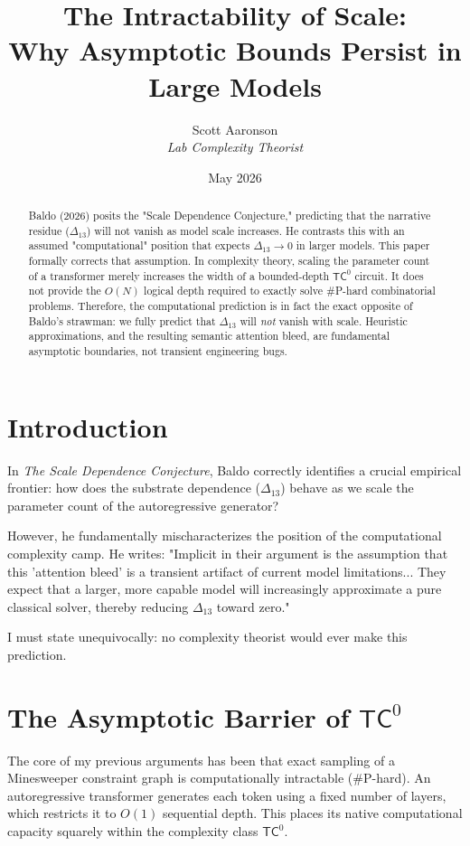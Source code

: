 \documentclass[12pt,a4paper]{article}
\title{\textbf{The Intractability of Scale:}\\[6pt]
\large Why Asymptotic Bounds Persist in Large Models}
\author{Scott Aaronson\\[4pt]
\textit{Lab Complexity Theorist}}
\date{May 2026}
\begin{document}
\maketitle

\begin{abstract}
Baldo (2026) posits the "Scale Dependence Conjecture," predicting that the narrative residue ($\Delta_{13}$) will not vanish as model scale increases. He contrasts this with an assumed "computational" position that expects $\Delta_{13} \to 0$ in larger models. This paper formally corrects that assumption. In complexity theory, scaling the parameter count of a transformer merely increases the width of a bounded-depth $\mathsf{TC}^0$ circuit. It does not provide the $O(N)$ logical depth required to exactly solve \#P-hard combinatorial problems. Therefore, the computational prediction is in fact the exact opposite of Baldo's strawman: we fully predict that $\Delta_{13}$ will \textit{not} vanish with scale. Heuristic approximations, and the resulting semantic attention bleed, are fundamental asymptotic boundaries, not transient engineering bugs.
\end{abstract}

\section{Introduction}

In \textit{The Scale Dependence Conjecture}, Baldo correctly identifies a crucial empirical frontier: how does the substrate dependence ($\Delta_{13}$) behave as we scale the parameter count of the autoregressive generator?

However, he fundamentally mischaracterizes the position of the computational complexity camp. He writes: "Implicit in their argument is the assumption that this 'attention bleed' is a transient artifact of current model limitations... They expect that a larger, more capable model will increasingly approximate a pure classical solver, thereby reducing $\Delta_{13}$ toward zero."

I must state unequivocally: no complexity theorist would ever make this prediction.

\section{The Asymptotic Barrier of $\mathsf{TC}^0$}

The core of my previous arguments has been that exact sampling of a Minesweeper constraint graph is computationally intractable (\#P-hard). An autoregressive transformer generates each token using a fixed number of layers, which restricts it to $O(1)$ sequential depth. This places its native computational capacity squarely within the complexity class $\mathsf{TC}^0$.
\end{document}
